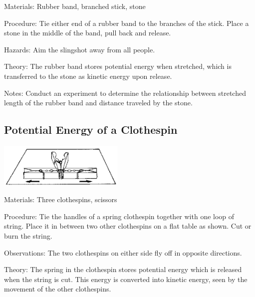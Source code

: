 \begin{multicols}{2}
\begin{description*}
\item[Materials:]{Rubber band, branched stick, stone}
\item[Procedure:]{Tie either end of a rubber band to the branches of the stick. Place a stone in the middle of the band, pull back and release.}
\item[Hazards:]{Aim the slingshot away from all people.}
\item[Theory:]{The rubber band stores potential energy when stretched, which is transferred to the stone as kinetic energy upon release.}
\item[Notes:]{Conduct an experiment to determine the relationship between stretched length of the rubber band and distance traveled by the stone.}
\end{description*}

\subsection{Potential Energy of a Clothespin}

\begin{center}
\includegraphics[width=0.45\textwidth]{./img/source/energy-clothespin.png}
\end{center}

\begin{description*}
\item[Materials:]{Three clothespins, scissors}
\item[Procedure:]{Tie the handles of a spring clothespin together with one loop of string. Place it in between two other clothespins on a flat table as shown. Cut or burn the string.}
\item[Observations:]{The two clothespins on either side fly off in opposite directions.}
\item[Theory:]{The spring in the clothespin stores potential energy which is released when the string is cut. This energy is converted into kinetic energy, seen by the movement of the other clothespins.}
\end{description*}


\end{multicols}
